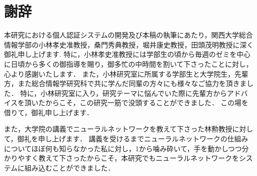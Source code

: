 \chapter*{謝辞}
本研究における個人認証システムの開発及び本稿の執筆にあたり，関西大学総合情報学部の小林孝史准教授，桑門秀典教授，堀井康史教授，田頭茂明教授に深く御礼申し上げます.
特に，小林孝史准教授には学部生の頃から毎週のゼミを中心に日頃から多くの御指導を賜り，御多忙の中時間を割いて下さったことに対し，心より感謝いたします．
また，小林研究室に所属する学部生と大学院生，先輩方，また総合情報学研究科で共に学んだ同輩の方々にも様々なご協力を頂きました．
特に，小林研究室に入り，研究テーマに悩んでいた際に先輩方からアドバイスを頂いたからこそ，この研究一筋で没頭することができました．
この場を借りて，御礼申し上げます．

また，大学院の講義でニューラルネットワークを教えて下さった林勲教授に対して，御礼を申し上げます．
講義を受けるまでニューラルネットワークの仕組みについてほぼ何も知らなかった私に対し，1から噛み砕いて，手を動かしつつ分かりやすく教えて下さったからこそ，本研究でもニューラルネットワークをシステムに組み込むことができました．
